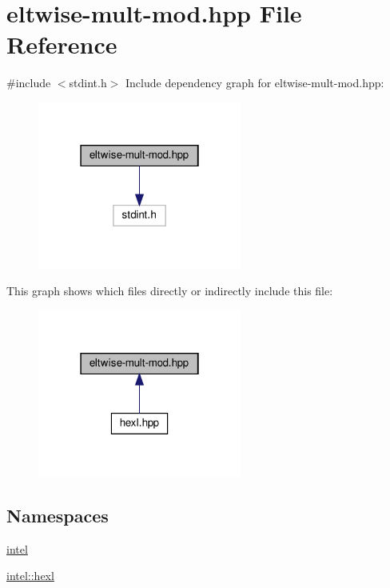 \hypertarget{eltwise-mult-mod_8hpp}{}\section{eltwise-\/mult-\/mod.hpp File Reference}
\label{eltwise-mult-mod_8hpp}
{\ttfamily \#include $<$stdint.\+h$>$}\newline
Include dependency graph for eltwise-\/mult-\/mod.hpp\+:
\nopagebreak
\begin{figure}[H]
\begin{center}
\leavevmode
\includegraphics[width=190pt]{eltwise-mult-mod_8hpp__incl}
\end{center}
\end{figure}
This graph shows which files directly or indirectly include this file\+:
\nopagebreak
\begin{figure}[H]
\begin{center}
\leavevmode
\includegraphics[width=190pt]{eltwise-mult-mod_8hpp__dep__incl}
\end{center}
\end{figure}
\subsection*{Namespaces}
\begin{DoxyCompactItemize}
\item 
 \hyperlink{namespaceintel}{intel}
\item 
 \hyperlink{namespaceintel_1_1hexl}{intel\+::hexl}
\end{DoxyCompactItemize}
